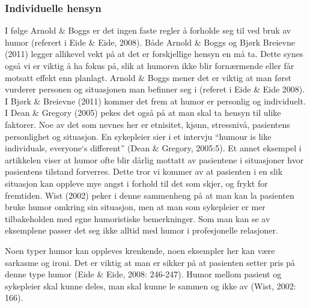 \subsubsection{Individuelle hensyn}

I følge Arnold \&{} Boggs er det ingen faste regler å forholde seg til ved bruk av
humor (referert i Eide \&{} Eide, 2008). Både Arnold \&{} Boggs og Bjørk Breievne
(2011) legger allikevel vekt på at det er forskjellige hensyn en må ta. Dette
synes også vi er viktig å ha fokus på, slik at humoren ikke blir fornærmende
eller får motsatt effekt enn planlagt. Arnold \&{} Boggs mener det er viktig at
man først vurderer personen og situasjonen man befinner seg i (referet i Eide \&
Eide 2008). I Bjørk \&{} Breievne (2011) kommer det frem at humor er personlig og
individuelt. I Dean \&{} Gregory (2005) pekes det også på at man skal ta hensyn
til ulike faktorer. Noe av det som nevnes her er etnisitet, kjønn, stressnivå,
pasientens personlighet og situasjon. En sykepleier sier i et intervju “humour
is like individuals, everyone`s different” (Dean \&{} Gregory, 2005:5). Et annet
eksempel i artikkelen viser at humor ofte blir dårlig mottatt av pasientene i
situasjoner hvor pasientens tilstand forverres. Dette tror vi kommer av at
pasienten i en slik situasjon kan oppleve mye angst i forhold til det som
skjer, og frykt for fremtiden. Wist (2002) peker i denne sammenheng på at man
kan la pasienten bruke humor omkring sin situasjon, men at man som sykepleier
er mer tilbakeholden med egne humoristiske bemerkninger. Som man kan se av
eksemplene passer det seg ikke alltid med humor i profesjonelle relasjoner.

Noen typer humor kan oppleves krenkende, noen eksempler her kan være sarkasme
og ironi. Det er viktig at man er sikker på at pasienten setter pris på denne
type humor (Eide \&{} Eide, 2008: 246-247). Humor mellom pasient og sykepleier
skal kunne deles, man skal kunne le sammen og ikke av (Wist, 2002: 166).

